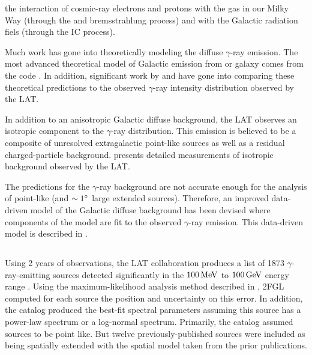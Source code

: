 the interaction of cosmic-ray electrons and protons with the gas in our
Milky Way (through the \pion and bremsstrahlung process) and with the
Galactic radiation fiels (through the \ac{IC} process).

Much work has gone into theoretically modeling the diffuse
$\gamma$-ray emission. The most advanced theoretical model
of Galactic emission from or galaxy comes from the \galprop code
\citep{strong_1998a_propagation-cosmic-ray,moskalenko_2000a_anisotropic-inverse}.
In addition, significant work by \cite{abdo_2009a_fermi-large} and
\cite{ackermann_2012a_fermi-lat-observations} have gone into comparing
these theoretical predictions to the observed $\gamma$-ray intensity
distribution observed by the \ac{LAT}.

In addition to an anisotropic Galactic diffuse background, the \ac{LAT}
observes an isotropic component to the $\gamma$-ray distribution.
This emission is believed to be a composite of unresolved extragalactic
point-like sources as well as a residual charged-particle background.
\cite{abdo_2010a_spectrum-isotropic} presents detailed measurements of
isotropic background observed by the \ac{LAT}.

The \galprop predictions for the $\gamma$-ray background are not
accurate enough for the analysis of point-like (and $\sim1^\circ$
large extended sources).  Therefore, an improved data-driven model
of the Galactic diffuse background has been devised where components
of the \galprop model are fit to the observed $\gamma$-ray emission.
This data-driven model is described in \cite{nolan_2012_fermi-large}.


\subsection{}

Using 2 years of observations, the \ac{LAT} collaboration produces
a list of 1873 $\gamma$-ray-emitting sources detected significantly
in the $100\,\text{MeV}$ to $100\,\text{GeV}$ energy range
\cite{nolan_2012_fermi-large}.  Using the maximum-likelihood analysis
method described in , \ac{2FGL}
computed for each source the position and uncertainty on this error. In
addition, the catalog produced the best-fit spectral parameters assuming
this source has a power-law spectrum or a log-normal spectrum.
Primarily, the catalog assumed sources to be point like. But twelve
previously-published sources were included as being spatially extended
with the spatial model taken from the prior publications.


